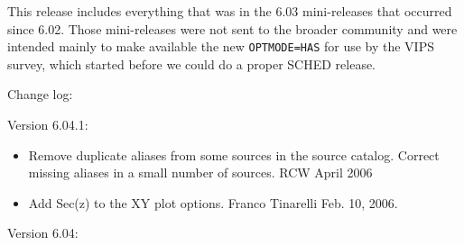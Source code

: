 \documentclass{report}
\begin{document}
This release includes everything that was in the 6.03 mini-releases
that occurred since 6.02.  Those mini-releases were not sent to the
broader community and were intended mainly to make available the
new {\tt OPTMODE=HAS} for use by the VIPS survey, which started before
we could do a proper SCHED release.

Change log:

Version 6.04.1:

\begin{itemize}

\item Remove duplicate aliases from some sources in the source catalog.  Correct
missing aliases in a small number of sources.   RCW April 2006

\item  Add Sec(z) to the XY plot options.  Franco Tinarelli  Feb. 10, 2006.

\end{itemize}

Version 6.04:
\end{document}
